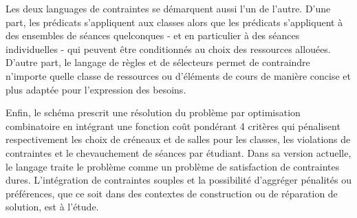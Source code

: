 Les deux languages de contraintes %
se démarquent aussi l'un de l'autre. 
D'une part, les prédicats {\ITC} s'appliquent aux classes alors que
les prédicats {\UTP} s'appliquent à des ensembles de séances quelconques - et en particulier à des séances individuelles - qui peuvent être conditionnés au choix des ressources allouées. 
D'autre part, le langage de règles et de sélecteurs {\UTP} permet de contraindre n'importe quelle classe de ressources ou d'éléments de cours de manière concise et plus adaptée pour l'expression des besoins.

Enfin, le schéma {\ITC} prescrit une résolution du problème par optimisation combinatoire en intégrant une fonction coût pondérant 4 critères qui pénalisent respectivement les choix de créneaux et de salles pour les classes, les violations de contraintes et le chevauchement de séances par étudiant.
Dans sa version actuelle, le langage {\UTP} traite le problème comme un problème de satisfaction de contraintes dures.
L'intégration de contraintes souples et la possibilité d'aggréger pénalités ou préférences, que ce soit dans des contextes de construction ou de réparation de solution, est à l'étude.



%
